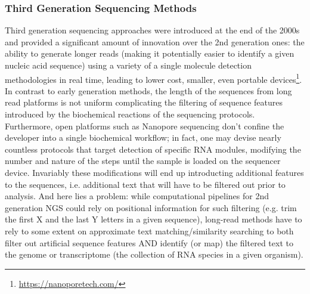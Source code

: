 \documentclass[10pt]{article}
\begin{document}
\subsubsection{Third Generation Sequencing Methods}
Third generation sequencing approaches were introduced at the end of the 2000s \cite{athanasopoulou_third-generation_2021,van_dijk_third_2018} and provided a significant amount of innovation over the 2nd generation ones: the ability to generate longer reads (making it potentially easier to identify a given nucleic acid sequence) using a variety of a single molecule detection methodologies in real time, leading to lower cost, smaller, even portable devices\footnote{\url{https://nanoporetech.com/}}. In  contrast to early generation methods, the length of the sequences from long read platforms is not uniform complicating the  filtering of sequence features introduced by the biochemical reactions of the sequencing protocols. Furthermore, open platforms such as Nanopore sequencing don't confine the developer into a single biochemical workflow; in fact, one may devise nearly countless protocols that target detection of specific RNA modules, modifying the number and nature of the steps until the sample is loaded on the sequencer device. Invariably these modifications will end up introducting additional features to the sequences, i.e. additional text that will have to be filtered out prior to analysis. And here lies a problem: while computational pipelines for 2nd generation NGS could rely on positional information for such filtering (e.g. trim the first X and the last Y letters in a given sequence), long-read methods have to rely to some extent on approximate text matching/similarity searching to both filter out artificial sequence features AND identify (or map) the filtered text to the genome or transcriptome (the collection of RNA species in a given organism).
\end{document}
